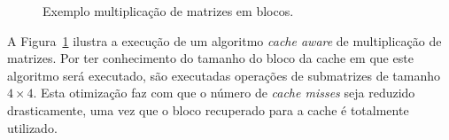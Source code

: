 \begin{figure}[hb]
    \centering
    \caption[Exemplo multiplicação de matrizes em blocos]{Exemplo multiplicação de matrizes em blocos.}
    \label{fig:multiplicacao_matriz_bloco}
\end{figure}

A Figura~\ref{fig:multiplicacao_matriz_bloco} ilustra a execução de um algoritmo \textit{cache aware} de multiplicação de matrizes. Por ter conhecimento do tamanho do bloco da cache em que este algoritmo será executado, são executadas operações de submatrizes de tamanho $4 \times 4$. Esta otimização faz com que o número de \textit{cache misses} seja reduzido drasticamente, uma vez que o bloco recuperado para a cache é totalmente utilizado.





